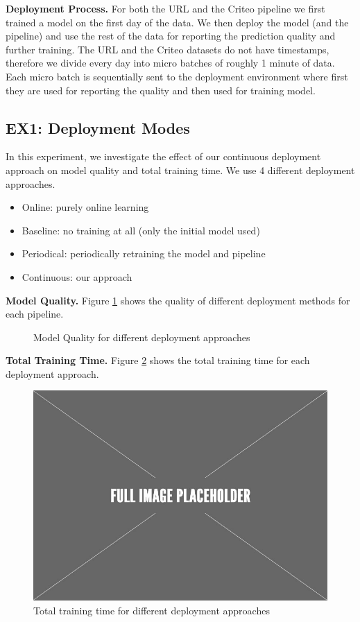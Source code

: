 \textbf{Deployment Process. }
For both the URL and the Criteo pipeline we first trained a model on the first day of the data.
We then deploy the model (and the pipeline) and use the rest of the data for reporting the prediction quality and further training.
The URL and the Criteo datasets do not have timestamps, therefore we divide every day into micro batches of roughly 1 minute of data. 
Each micro batch is sequentially sent to the deployment environment where first they are used for reporting the quality and then used for training model.

\subsection{EX1: Deployment Modes}
In this experiment, we investigate the effect of our continuous deployment approach on model quality and total training time.
We use 4 different deployment approaches.
\begin{itemize}
\item Online: purely online learning
\item Baseline: no training at all (only the initial model used)
\item Periodical: periodically retraining the model and pipeline
\item Continuous: our approach
\end{itemize}

\textbf{Model Quality. }
Figure \ref{deployment-quality-figure} shows the quality of different deployment methods for each pipeline.

\begin{figure}[h!]
\centering
\resizebox{\columnwidth}{!}{}
\caption{Model Quality for different deployment approaches}
\label{deployment-quality-figure}
\end{figure}

\textbf{Total Training Time. }
Figure \ref{deployment-time-figure} shows the total training time for each deployment approach.

\begin{figure}[h!]
\centering
\includegraphics[width=\columnwidth]{../images/placeholder.jpeg}
\caption{Total training time for different deployment approaches}
\label{deployment-time-figure}
\end{figure}

